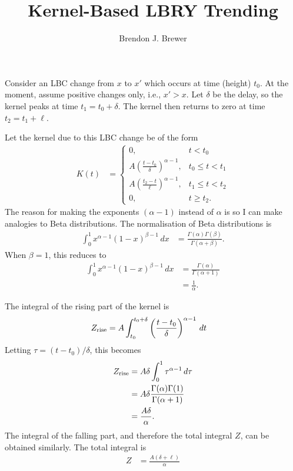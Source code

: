 \documentclass[a4paper, 12pt]{article}
\title{Kernel-Based LBRY Trending}
\author{Brendon J. Brewer}
\date{}
\begin{document}
\maketitle


\setlength{\parindent}{0pt}
\setlength{\parskip}{8pt}

Consider an LBC change from $x$ to $x'$ which occurs at time (height) $t_0$.
At the moment, assume positive changes only, i.e., $x' > x$.
Let $\delta$ be the delay, so the kernel peaks at time $t_1 = t_0 + \delta$.
The kernel then returns to zero at time $t_2 = t_1 + \ell$.

Let the kernel due to this LBC change be of the form
\begin{align}
K(t) &=
    \left\{
        \begin{array}{lr}
            0, & t < t_0 \\
            A\left(\frac{t - t_0}{\delta}\right)^{\alpha-1}, & t_0 \leq t < t_1 \\
            A\left(\frac{t_2 - t}{\ell}  \right)^{\alpha-1}, & t_1 \leq t < t_2 \\
            0, & t \geq t_2.
        \end{array}
    \right.
\end{align}
The reason for making the exponents $(\alpha-1)$ instead of $\alpha$ is
so I can make analogies to Beta distributions. The normalisation of Beta
distributions is
\begin{align}
\int_0^1 x^{\alpha-1}(1-x)^{\beta-1} \, dx
    &= \frac{\Gamma(\alpha)\Gamma(\beta)}{\Gamma(\alpha+\beta)}.
\end{align}
When $\beta=1$, this reduces to
\begin{align}
\int_0^1 x^{\alpha-1}(1-x)^{\beta-1} \, dx
    &= \frac{\Gamma(\alpha)}{\Gamma(\alpha+1)} \\
    &= \frac{1}{\alpha}.
\end{align}


The integral of the rising part of the kernel is
\begin{align}
Z_{\rm rise} &= A\int_{t_0}^{t_0+\delta}
                    \left(\frac{t - t_0}{\delta}\right)^{\alpha-1} \, dt
\end{align}
Letting $\tau = (t-t_0)/\delta$, this becomes
\begin{align}
Z_{\rm rise} &= A\delta\int_0^1
                    \tau^{\alpha-1} \, d\tau \\
             &= A\delta
                    \frac{\Gamma(\alpha)\Gamma(1)}{\Gamma(\alpha+1)} \\
             &= \frac{A\delta}{\alpha}.
\end{align}
The integral of the falling part, and therefore the total integral $Z$,
can be obtained similarly. The total integral is
\begin{align}
Z &= \frac{A(\delta + \ell)}{\alpha}
\end{align}
\end{document}
